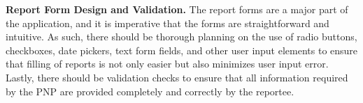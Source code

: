 \textbf{Report Form Design and Validation.} 
The report forms are a major part of the application, and it is imperative that the forms are  straightforward and intuitive. As such, there should be thorough planning on the use of radio buttons, checkboxes, date pickers, text form fields, and other user input elements to ensure that filling of reports is not only easier but also minimizes user input error. Lastly, there should be validation checks to ensure that all information required by the PNP are provided completely and correctly by the reportee.